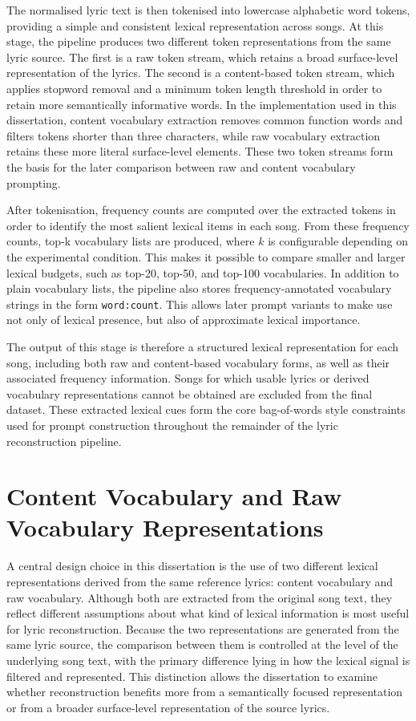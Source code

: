 The normalised lyric text is then tokenised into lowercase alphabetic word tokens, providing a simple and consistent lexical representation across songs. At this stage, the pipeline produces two different token representations from the same lyric source. The first is a raw token stream, which retains a broad surface-level representation of the lyrics. The second is a content-based token stream, which applies stopword removal and a minimum token length threshold in order to retain more semantically informative words. In the implementation used in this dissertation, content vocabulary extraction removes common function words and filters tokens shorter than three characters, while raw vocabulary extraction retains these more literal surface-level elements. These two token streams form the basis for the later comparison between raw and content vocabulary prompting.

After tokenisation, frequency counts are computed over the extracted tokens in order to identify the most salient lexical items in each song. From these frequency counts, top-k vocabulary lists are produced, where \(k\) is configurable depending on the experimental condition. This makes it possible to compare smaller and larger lexical budgets, such as top-20, top-50, and top-100 vocabularies. In addition to plain vocabulary lists, the pipeline also stores frequency-annotated vocabulary strings in the form \texttt{word:count}. This allows later prompt variants to make use not only of lexical presence, but also of approximate lexical importance.

The output of this stage is therefore a structured lexical representation for each song, including both raw and content-based vocabulary forms, as well as their associated frequency information. Songs for which usable lyrics or derived vocabulary representations cannot be obtained are excluded from the final dataset. These extracted lexical cues form the core bag-of-words style constraints used for prompt construction throughout the remainder of the lyric reconstruction pipeline.

\section{Content Vocabulary and Raw Vocabulary Representations}

A central design choice in this dissertation is the use of two different lexical representations derived from the same reference lyrics: content vocabulary and raw vocabulary. Although both are extracted from the original song text, they reflect different assumptions about what kind of lexical information is most useful for lyric reconstruction. Because the two representations are generated from the same lyric source, the comparison between them is controlled at the level of the underlying song text, with the primary difference lying in how the lexical signal is filtered and represented. This distinction allows the dissertation to examine whether reconstruction benefits more from a semantically focused representation or from a broader surface-level representation of the source lyrics.

